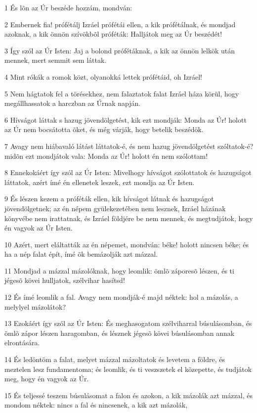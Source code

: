 \par 1 És lõn az Úr beszéde hozzám, mondván:
\par 2 Embernek fia! prófétálj Izráel prófétái ellen, a kik prófétálnak, és mondjad azoknak, a kik önnön szívökbõl próféták: Halljátok meg az Úr beszédét!
\par 3 Így szól az Úr Isten: Jaj a bolond prófétáknak, a kik az önnön lelkök után mennek, mert semmit  sem láttak.
\par 4 Mint rókák a romok közt, olyanokká lettek prófétáid, oh Izráel!
\par 5 Nem hágtatok fel a törésekhez, nem falaztatok falat Izráel háza körül, hogy megállhassatok a harczban az Úrnak napján.
\par 6 Hívságot láttak s hazug jövendölgetést, kik ezt mondják: Monda az Úr! holott az Úr nem bocsátotta õket, és még várják, hogy betelik beszédök.
\par 7 Avagy nem hiábavaló látást láttatok-é, és nem hazug jövendölgetést szóltatok-é? midõn ezt mondjátok vala: Monda az Úr! holott én nem szólottam!
\par 8 Ennekokáért így szól az Úr Isten: Mivelhogy hívságot szólottatok és hazugságot láttatok, azért ímé én ellenetek leszek, ezt mondja az Úr Isten.
\par 9 És lészen kezem a próféták ellen, kik hívságot látnak és hazugságot jövendölgetnek; az én népem gyülekezetében nem lesznek, Izráel házának könyvébe nem irattatnak, és Izráel földjére be nem mennek, és megtudjátok, hogy én vagyok az Úr Isten.
\par 10 Azért, mert eláltatták az én népemet, mondván: béke! holott nincsen béke; és ha a nép falat épít, ímé õk bemázolják azt mázzal.
\par 11 Mondjad a mázzal mázolóknak, hogy leomlik: ömlõ záporesõ lészen, és ti jégesõ kövei hulljatok, szélvihar hasítsd!
\par 12 És ímé leomlik a fal. Avagy nem mondják-é majd néktek: hol a mázolás, a melylyel mázolátok?
\par 13 Ezokáért így szól az Úr Isten: És meghasogatom szélviharral búsulásomban, és ömlõ zápor lészen haragomban, és lésznek jégesõ kövei búsulásomban annak elrontására.
\par 14 És ledöntöm a falat, melyet mázzal mázoltatok és levetem a földre, és meztelen lesz fundamentoma; és leomlik, és ti veszszetek el közepette, és tudjátok meg, hogy én vagyok az Úr.
\par 15 És teljessé teszem búsulásomat a falon és azokon, a kik mázolák azt mázzal, és mondom néktek: nincs a fal és nincsenek, a kik azt mázolák,
